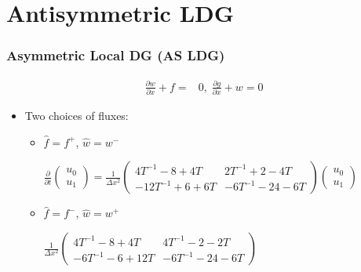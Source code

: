 \documentclass[serif,12pt]{beamer}
\begin{document}
\section{Antisymmetric LDG}
\begin{frame}
  \frametitle{Asymmetric Local DG (AS LDG)}
  \begin{align*}
    \frac{\partial w}{\partial x} + f =& 0,\; \frac{\partial g}{\partial x} + w = 0
  \end{align*}
  \begin{itemize}
  \item Two choices of fluxes:
    \begin{itemize}
    \item $\hat{f} = f^+$, $\hat{w} = w^-$\\
      \begin{center}
        $\frac{\partial}{\partial t}\left(\begin{array}{cc}u_0\\u_1
          \end{array}\right) = \frac{1}{\Delta x^2}\left(
          \begin{array}{cc}
            4T^{-1} -8+4 T & 2T^{-1}+2-4 T \\
            -12 T^{-1} +6+6 T & -6 T^{-1} -24-6 T
          \end{array}\right)\left(\begin{array}{c}
            u_0 \\
            u_1 
          \end{array}
        \right)$
      \end{center}
    \item $\hat{f} = f^-$, $\hat{w} = w^+$\\
      \begin{center}
        $\frac{1}{\Delta x^2}\left(
          \begin{array}{cc}
            4T^{-1} -8+4 T & 4T^{-1}-2-2 T \\
            -6 T^{-1} -6+12 T & -6 T^{-1} -24-6 T
          \end{array}
        \right)$
      \end{center}
    \end{itemize}
  \end{itemize}
\end{frame}
\end{document}

